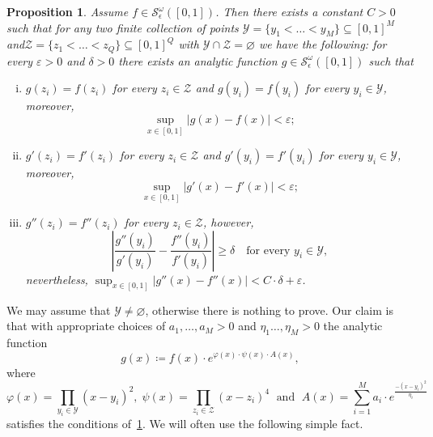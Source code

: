 \documentclass[12pt,]{article}
\def\cref#1{\ref{#1}}%
\newtheorem{proposition}[theorem]{Proposition}
\theoremstyle{definition}
\theoremstyle{remark}
\newcommand{\0}{\mathbf{0}}
\begin{document}
\begin{proposition}\label{prop:AnalyticBumpFunc}
Assume $f\in \mathcal{S}^{\omega}_\epsilon([0,1])$. Then there exists a constant $C>0$ such that for any two finite collection of points
$\mathcal{Y}=\{y_1<\ldots<y_M\}\subseteq[0,1]^M$ and\linebreak $\mathcal{Z}=\{z_1<\ldots<
z_Q\}\subseteq[0,1]^Q$ with $\mathcal{Y}\cap\mathcal{Z}=\varnothing$ we have the following: for
every $\varepsilon>0$ and $\delta>0$ there exists an analytic function
$g\in\mathcal{S}^{\omega}_\epsilon([0,1])$ such that
\begin{enumerate}[(i)]
\item $g(z_i)=f(z_i)$ for every $z_i\in\mathcal{Z}$ and $g(y_i)=f(y_i)$ for every $y_i\in\mathcal{Y}$, moreover,
\begin{equation*}
\sup_{x\in[0,1]}|g(x)-f(x)|<\varepsilon;
\end{equation*}
\item  $g'(z_i)=f'(z_i)$ for every $z_i\in\mathcal{Z}$ and $g'(y_i)=f'(y_i)$ for every $y_i\in\mathcal{Y}$, moreover,
\begin{equation*}
	\sup_{x\in[0,1]}|g'(x)-f'(x)|<\varepsilon;
\end{equation*}
\item $g''(z_i)=f''(z_i)$ for every $z_i\in\mathcal{Z}$, however,
\begin{equation*}
	\left| \frac{g''(y_i)}{g'(y_i)} - \frac{f''(y_i)}{f'(y_i)} \right|\geq \delta \quad\text{
	for every } y_i\in\mathcal{Y},
\end{equation*}
nevertheless, $	\sup_{x\in[0,1]}|g''(x)-f''(x)|<C\cdot \delta +\varepsilon$.
\end{enumerate}
\end{proposition}

We may assume that $\mathcal{Y}\neq\varnothing$, otherwise there is nothing to prove. Our claim is
that with appropriate choices of $a_1,\ldots,a_M>0$ and $\eta_1\ldots,\eta_M>0$ the analytic
function
\begin{equation}\label{eq:BumpFunc}
g(x)\coloneqq f(x)\cdot e^{\varphi(x)\cdot \psi(x)\cdot A(x)},
\end{equation} 
where
\begin{equation*}
\varphi(x)=\prod_{y_i\in\mathcal{Y}} (x-y_i)^2,\; \psi(x) = \prod_{z_i\in\mathcal{Z}} (x-z_i)^4
\;\text{ and }\; A(x)= \sum_{i=1}^{M} a_i\cdot e^{\frac{-(x-y_i)^2}{\eta_i}}
\end{equation*}
satisfies the conditions of~\cref{prop:AnalyticBumpFunc}. We will often use the following simple fact.
\end{document}
